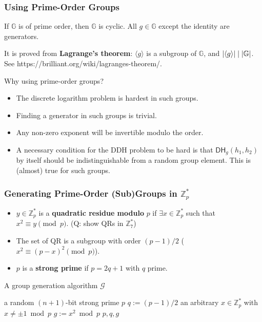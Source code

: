 \begin{frame}\frametitle{Using Prime-Order Groups}
\begin{theorem}
 If $\mathbb{G}$ is of prime order, then $\mathbb{G}$ is cyclic. All $g \in \mathbb{G}$ except the identity are generators.
\end{theorem}
It is proved from \textbf{Lagrange's theorem}: $\langle g \rangle$ is a subgroup of $\mathbb{G}$, and $\lvert\langle g \rangle\rvert \mid \lvert\mathbb{G}\rvert$.
See https://brilliant.org/wiki/lagranges-theorem/. 

Why using prime-order groups?
\begin{itemize}
\item The discrete logarithm problem is hardest in such groups.
\item Finding a generator in such groups is trivial.
\item Any non-zero exponent will be invertible modulo the order.
\item A necessary condition for the DDH problem to be hard is that $\mathsf{DH}_g(h_1,h_2)$ by itself should be indistinguishable from a random group element. This is (almost) true for such groups.
\end{itemize}
\end{frame}
\begin{frame}\frametitle{Generating Prime-Order (Sub)Groups in $\mathbb{Z}^*_p$}
\begin{itemize}
\item $y \in \mathbb{Z}^*_p$ is a \textbf{quadratic residue modulo} $p$ if $\exists x \in \mathbb{Z}^*_p$ such that $x^2 \equiv y \pmod p$. \alert{(Q: show QRs in $\mathbb{Z}_{7}^{*}$)} %
\item The set of QR is a subgroup with order $(p-1)/2$ ($x^2 \equiv (p-x)^2 \pmod p$).
\item $p$ is a \textbf{strong prime} if $p=2q+1$ with $q$ prime.
\end{itemize}
\begin{algorithm}[H]
\DontPrintSemicolon
\caption{A group generation algorithm $\mathcal{G}$}
\BlankLine
\KwG a random $(n+1)$-bit strong prime $p$\;
$q := (p-1)/2$\;
\KwC an arbitrary $x \in \mathbb{Z}^*_p$ with $x \neq \pm 1 \bmod p$\;
$g := x^2 \bmod p$\;
\Return $p,q,g$
\end{algorithm}
\end{frame}

